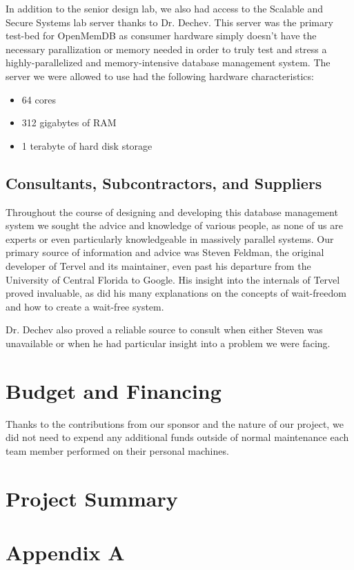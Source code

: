 \documentclass[letterpaper, 12pt]{article}
\begin{document}
\par\vspace{\baselineskip}
In addition to the senior design lab, we also had access to the Scalable and Secure Systems lab server
thanks to Dr. Dechev. This server was the primary test-bed for OpenMemDB as consumer hardware simply
doesn't have the necessary parallization or memory needed in order to truly test and stress a
highly-parallelized and memory-intensive database management system. The server we were allowed to 
use had the following hardware characteristics:
\begin{itemize}
 \item 64 cores
 \item 312 gigabytes of RAM
 \item 1 terabyte of hard disk storage
\end{itemize}

\newpage

\subsection{Consultants, Subcontractors, and Suppliers}
Throughout the course of designing and developing this database management system we sought the advice
and knowledge of various people, as none of us are experts or even particularly knowledgeable in 
massively parallel systems. Our primary source of information and advice was Steven Feldman, the 
original developer of Tervel and its maintainer, even past his departure from the University of Central
Florida to Google. His insight into the internals of Tervel proved invaluable, as did his many 
explanations on the concepts of wait-freedom and how to create a wait-free system.
\par\vspace{\baselineskip}
Dr. Dechev also proved a reliable source to consult when either Steven was unavailable or when he
had particular insight into a problem we were facing. 
\newpage

\section{Budget and Financing}
Thanks to the contributions from our sponsor and the nature of our project, we did not need to expend
any additional funds outside of normal maintenance each team member performed on their personal
machines.
\newpage

\section{Project Summary}
\newpage



\newpage

\appendix
\section{Appendix A}
\end{document}
